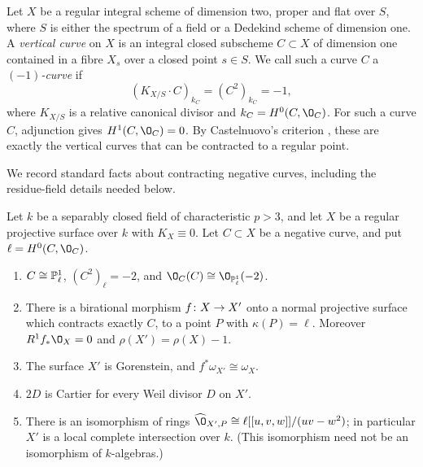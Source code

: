 
\begin{definition}\label{def:minus-one-curve}
Let $X$ be a regular integral scheme of dimension two, proper and flat over $S$, where $S$ is either the spectrum of a field or a Dedekind scheme of dimension one.
A \emph{vertical curve} on $X$ is an integral closed subscheme $C\subset X$ of dimension one contained in a fibre $X_s$ over a closed point $s\in S$.
We call such a curve $C$ a \emph{$(-1)$-curve} if
\[
  (K_{X/S}\cdot C)_{k_C} = (C^2)_{k_C} = -1,
\]
where $K_{X/S}$ is a relative canonical divisor and $k_C = H^0(C,\O_C)$.
For such a curve $C$, adjunction gives $H^1(C,\O_C) = 0$.
By Castelnuovo's criterion \cite[Theorem~9.3.8 and Proposition~9.3.10]{Liu02}, these are exactly the vertical curves that can be contracted to a regular point.
\end{definition}

We record standard facts about contracting negative curves, including the residue-field details needed below.

\begin{lemma}\label{lem:contraction}
Let $k$ be a separably closed field of characteristic $p>3$, and let $X$ be a regular projective surface over $k$ with $K_X\equiv 0$.
Let $C\subset X$ be a negative curve, and put $\ell = H^0(C,\O_C)$.
\begin{enumerate}
\item $C\cong\mathbb{P}^1_\ell$, $(C^2)_\ell = -2$, and $\O_C(C)\cong\O_{\PP^1_\ell}(-2)$.
\item There is a birational morphism $f\colon X\to X'$ onto a normal projective surface which contracts exactly $C$, to a point $P$ with $\kappa(P) = \ell$.
  Moreover $R^1f_*\O_X = 0$ and $\rho(X') = \rho(X)-1$.
\item The surface $X'$ is Gorenstein, and $f^*\omega_{X'}\cong\omega_X$.
\item $2D$ is Cartier for every Weil divisor $D$ on $X'$.
\item There is an isomorphism of rings $\widehat\O_{X',P}\cong \ell[[u,v,w]]/(uv-w^2)$; in particular $X'$ is a local complete intersection over $k$.
  \textup{(}This isomorphism need not be an isomorphism of $k$-algebras.\textup{)}
\end{enumerate}
\end{lemma}

